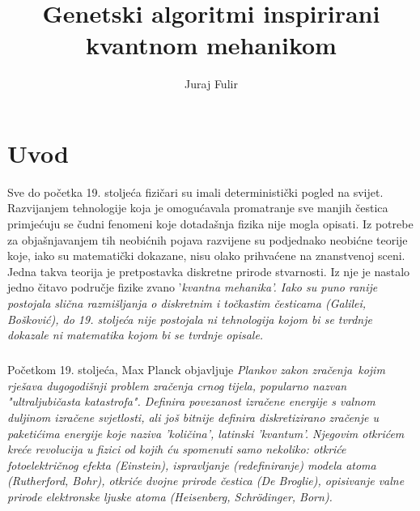 \documentclass[times, utf8, zavrsni]{fer}
\begin{document}
\title{Genetski algoritmi inspirirani kvantnom mehanikom}
\author{Juraj Fulir}
\maketitle

\izvornik


\tableofcontents

\chapter{Uvod}
Sve do početka 19. stoljeća fizičari su imali deterministički pogled na svijet. Razvijanjem tehnologije koja je omogućavala promatranje sve manjih čestica primjećuju se čudni fenomeni koje dotadašnja fizika nije mogla opisati. Iz potrebe za objašnjavanjem tih neobićnih pojava razvijene su podjednako neobićne teorije koje, iako su matematički dokazane, nisu olako prihvaćene na znanstvenoj sceni. Jedna takva teorija je pretpostavka diskretne prirode stvarnosti. Iz nje je nastalo jedno čitavo područje fizike zvano '\it kvantna mehanika\rm '. Iako su puno ranije postojala slična razmišljanja o diskretnim i točkastim česticama (Galilei, Bošković), do 19. stoljeća nije postojala ni tehnologija kojom bi se tvrdnje dokazale ni matematika kojom bi se tvrdnje opisale.

\paragraph{}
Početkom 19. stoljeća, Max Planck objavljuje \it Plankov zakon zračenja\rm\ kojim rješava dugogodišnji problem zračenja crnog tijela, popularno nazvan "\it ultraljubičasta katastrofa\rm". Definira povezanost izračene energije s valnom duljinom izračene svjetlosti, ali još bitnije definira diskretizirano zračenje u paketićima energije koje naziva 'količina', latinski 'kvantum'. Njegovim otkrićem kreće revolucija u fizici od kojih ću spomenuti samo nekoliko: otkriće fotoelektričnog efekta (Einstein), ispravljanje (redefiniranje) modela atoma (Rutherford, Bohr), otkriće dvojne prirode čestica (De Broglie), opisivanje valne prirode elektronske ljuske atoma (Heisenberg, Schr\"odinger, Born).
\end{document}
